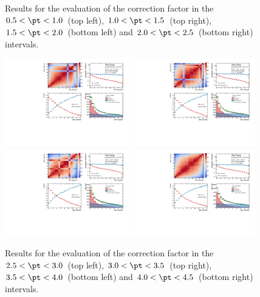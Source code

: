 \begin{figure}
    \caption{Results for the evaluation of the \fpds correction factor in the $0.5 < \pt < 1.0$~\gevc (top left), $1.0 < \pt < 1.5$~\gevc (top right), $1.5 < \pt < 2.0$~\gevc (bottom left) and $2.0 < \pt < 2.5$~\gevc (bottom right) intervals.}
\end{figure}

\begin{figure}
    \centering
    \includegraphics[width=0.48\textwidth]{Figures/Chapter 6/AllPropmtFracs/Ds/DsPromptFrac25_30.pdf}
    \includegraphics[width=0.48\textwidth]{Figures/Chapter 6/AllPropmtFracs/Ds/DsPromptFrac30_35.pdf}
    \includegraphics[width=0.48\textwidth]{Figures/Chapter 6/AllPropmtFracs/Ds/DsPromptFrac35_40.pdf}
    \includegraphics[width=0.48\textwidth]{Figures/Chapter 6/AllPropmtFracs/Ds/DsPromptFrac40_45.pdf}
    \caption{Results for the evaluation of the \fpds correction factor in the $2.5 < \pt < 3.0$~\gevc (top left), $3.0 < \pt < 3.5$~\gevc (top right), $3.5 < \pt < 4.0$~\gevc (bottom left) and $4.0 < \pt < 4.5$~\gevc (bottom right) intervals.}
\end{figure}


